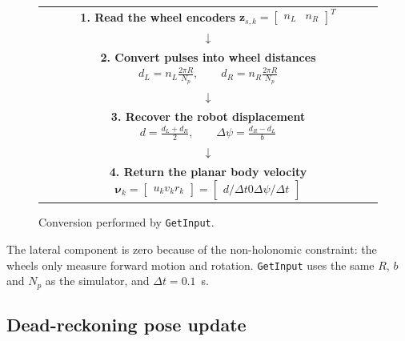 \documentclass[letterpaper,12pt]{article}
\begin{document}
\begin{figure}[H]
    \centering
    \begin{tabular}{c}
        \fbox{\parbox{0.82\textwidth}{\centering
        \textbf{1. Read the wheel encoders}\\[-0.1em]
        $\displaystyle
        \boldsymbol{z}_{s,k}=\begin{bmatrix}n_L&n_R\end{bmatrix}^{T}$}}\\[0.25em]
        $\downarrow$\\[0.25em]
        \fbox{\parbox{0.82\textwidth}{\centering
        \textbf{2. Convert pulses into wheel distances}\\[-0.1em]
        $\displaystyle
        d_L=n_L\frac{2\pi R}{N_p},\qquad
        d_R=n_R\frac{2\pi R}{N_p}$}}\\[0.25em]
        $\downarrow$\\[0.25em]
        \fbox{\parbox{0.82\textwidth}{\centering
        \textbf{3. Recover the robot displacement}\\[-0.1em]
        $\displaystyle
        d=\frac{d_L+d_R}{2},\qquad
        \Delta\psi=\frac{d_R-d_L}{b}$}}\\[0.25em]
        $\downarrow$\\[0.25em]
        \fbox{\parbox{0.82\textwidth}{\centering
        \textbf{4. Return the planar body velocity}\\[-0.1em]
        $\displaystyle
        \boldsymbol{\nu}_k=
        \begin{bmatrix}u_k\\v_k\\r_k\end{bmatrix}
        =\begin{bmatrix}d/\Delta t\\0\\\Delta\psi/\Delta t\end{bmatrix}$}}
    \end{tabular}
    \caption{Conversion performed by \texttt{GetInput}.}
    \label{fig:get-input-flow}
\end{figure}

The lateral component is zero because of the non-holonomic constraint: the
wheels only measure forward motion and rotation. \texttt{GetInput} uses the
same $R$, $b$ and $N_p$ as the simulator, and $\Delta t=0.1$~s.

\subsection{Dead-reckoning pose update}
\end{document}
